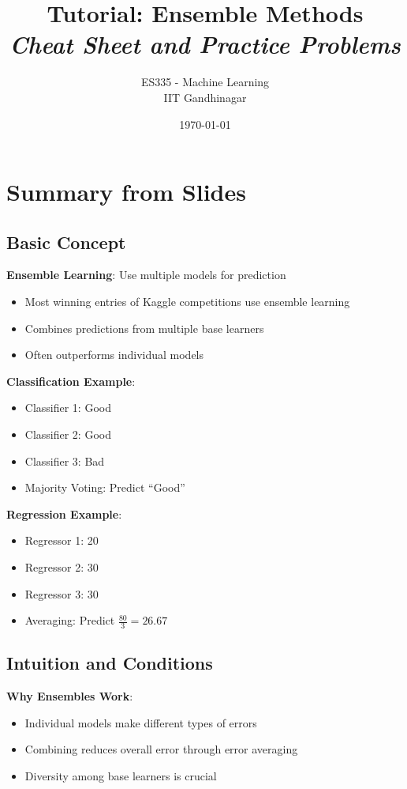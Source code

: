\documentclass{article}
\title{\textbf{Tutorial: Ensemble Methods} \\ \textit{Cheat Sheet and Practice Problems}}
\author{ES335 - Machine Learning \\ IIT Gandhinagar}
\date{\today}
\begin{document}
\maketitle

\section{Summary from Slides}

\subsection{Basic Concept}

\textbf{Ensemble Learning}: Use multiple models for prediction
\begin{itemize}
    \item Most winning entries of Kaggle competitions use ensemble learning
    \item Combines predictions from multiple base learners
    \item Often outperforms individual models
\end{itemize}

\textbf{Classification Example}:
\begin{itemize}
    \item Classifier 1: Good
    \item Classifier 2: Good  
    \item Classifier 3: Bad
    \item Majority Voting: Predict ``Good''
\end{itemize}

\textbf{Regression Example}:
\begin{itemize}
    \item Regressor 1: 20
    \item Regressor 2: 30
    \item Regressor 3: 30
    \item Averaging: Predict $\frac{80}{3} = 26.67$
\end{itemize}

\subsection{Intuition and Conditions}

\textbf{Why Ensembles Work}:
\begin{itemize}
    \item Individual models make different types of errors
    \item Combining reduces overall error through error averaging
    \item Diversity among base learners is crucial
\end{itemize}
\end{document}
